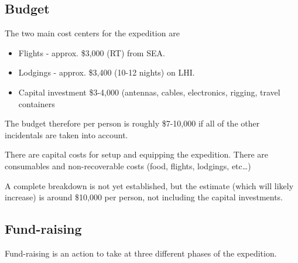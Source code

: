 \documentclass[11pt]{article}
\begin{document}
\subsection{Budget}

The two main cost centers for the expedition are

\begin{itemize}
\item Flights - approx. \$3,000 (RT) from SEA.
\item Lodgings - approx. \$3,400 (10-12 nights) on LHI.
\item Capital investment \$3-4,000 (antennas, cables, electronics,
rigging, travel containers
\end{itemize}

The budget therefore per person is roughly \$7-10,000 if all 
of the other incidentals are taken into account.
\par
There are capital costs for setup and equipping the expedition.
There are consumables and non-recoverable costs (food, 
flights, lodgings, etc\ldots)

\par
A complete breakdown is not yet established, but the estimate
(which will likely increase) is around \$10,000 per person, not 
including the capital investments.

\subsection{Fund-raising}

Fund-raising is an action to take at three different phases of the
expedition.
\end{document}
